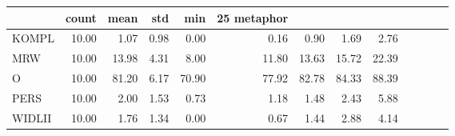\begin{tabular}{lrrrrrrrr}
\toprule
 & count & mean & std & min & 25%
metaphor &  &  &  &  &  &  &  &  \\
\midrule
KOMPL & 10.00 & 1.07 & 0.98 & 0.00 & 0.16 & 0.90 & 1.69 & 2.76 \\
MRW & 10.00 & 13.98 & 4.31 & 8.00 & 11.80 & 13.63 & 15.72 & 22.39 \\
O & 10.00 & 81.20 & 6.17 & 70.90 & 77.92 & 82.78 & 84.33 & 88.39 \\
PERS & 10.00 & 2.00 & 1.53 & 0.73 & 1.18 & 1.48 & 2.43 & 5.88 \\
WIDLII & 10.00 & 1.76 & 1.34 & 0.00 & 0.67 & 1.44 & 2.88 & 4.14 \\
\bottomrule
\end{tabular}
